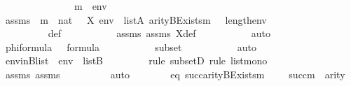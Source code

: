 \begin{isabellebody}
\ \ \ \ \isamarkupfalse%
\ {\isacharminus}{\kern0pt}\ \isanewline
\ \ \ \ \ \ \isamarkupfalse%
\ m\ {\isasymphi}\ env\isanewline
\ \ \ \ \ \ \isamarkupfalse%
\ assms{}\ {\isacharcolon}{\kern0pt}\ {\isachardoublequoteopen}m\ {\isasymin}\ nat{\isachardoublequoteclose}\ {\isachardoublequoteopen}{\isasymphi}\ {\isasymin}\ X{\isachardoublequoteclose}\ {\isachardoublequoteopen}env\ {\isasymin}\ list{\isacharparenleft}{\kern0pt}A{\isacharparenright}{\kern0pt}{\isachardoublequoteclose}\ {\isachardoublequoteopen}arity{\isacharparenleft}{\kern0pt}BExists{\isacharprime}{\kern0pt}{\isacharparenleft}{\kern0pt}m{\isacharcomma}{\kern0pt}\ {\isasymphi}{\isacharparenright}{\kern0pt}{\isacharparenright}{\kern0pt}\ {\isasymle}\ length{\isacharparenleft}{\kern0pt}env{\isacharparenright}{\kern0pt}{\isachardoublequoteclose}\isanewline
\isanewline
\ \ \ \ \ \ \isamarkupfalse%
\ {\isachardoublequoteopen}{\isasymphi}\ {\isasymin}\ {\isasymDelta}{}{\isachardoublequoteclose}\ \isanewline
\ \ \ \ \ \ \ \ \isamarkupfalse%
\ {\isasymDelta}{}{\isacharunderscore}{\kern0pt}def\ \isanewline
\ \ \ \ \ \ \ \ \isamarkupfalse%
\ assms{}\ assms{}\ X{\isacharunderscore}{\kern0pt}def\ \isanewline
\ \ \ \ \ \ \ \ \isamarkupfalse%
\ auto\isanewline
\ \ \ \ \ \ \isamarkupfalse%
\ \isamarkupfalse%
\ phiformula{\isacharcolon}{\kern0pt}\ {\isachardoublequoteopen}{\isasymphi}\ {\isasymin}\ formula{\isachardoublequoteclose}\ \isanewline
\ \ \ \ \ \ \ \ \isamarkupfalse%
\ {\isasymDelta}{}{\isacharunderscore}{\kern0pt}subset\ \isanewline
\ \ \ \ \ \ \ \ \isamarkupfalse%
\ auto\isanewline
\isanewline
\ \ \ \ \ \ \isamarkupfalse%
\ envinBlist\ {\isacharcolon}{\kern0pt}\ {\isachardoublequoteopen}env\ {\isasymin}\ list{\isacharparenleft}{\kern0pt}B{\isacharparenright}{\kern0pt}{\isachardoublequoteclose}\isanewline
\ \ \ \ \ \ \ \ \isamarkupfalse%
{\isacharparenleft}{\kern0pt}rule\ subsetD{\isacharcomma}{\kern0pt}\ rule\ list{\isacharunderscore}{\kern0pt}mono{\isacharparenright}{\kern0pt}\isanewline
\ \ \ \ \ \ \ \ \isamarkupfalse%
\ assms{}\ assms\isanewline
\ \ \ \ \ \ \ \ \isamarkupfalse%
\ auto\isanewline
\isanewline
\ \ \ \ \ \ \isamarkupfalse%
\ eq{\isacharcolon}{\kern0pt}\ {\isachardoublequoteopen}succ{\isacharparenleft}{\kern0pt}arity{\isacharparenleft}{\kern0pt}BExists{\isacharprime}{\kern0pt}{\isacharparenleft}{\kern0pt}m{\isacharcomma}{\kern0pt}\ {\isasymphi}{\isacharparenright}{\kern0pt}{\isacharparenright}{\kern0pt}{\isacharparenright}{\kern0pt}\ {\isacharequal}{\kern0pt}\ {}\ {\isasymunion}\ succ{\isacharparenleft}{\kern0pt}m{\isacharparenright}{\kern0pt}\ {\isasymunion}\ arity{\isacharparenleft}{\kern0pt}{\isasymphi}{\isacharparenright}{\kern0pt}{\isachardoublequoteclose}\isanewline

\end{isabellebody}
